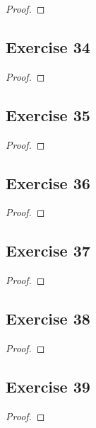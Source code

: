 \documentclass[14pt]{extarticle}
\begin{document}
\begin{proof}

\end{proof}

\subsection{Exercise 34}

\begin{proof}

\end{proof}

\subsection{Exercise 35}

\begin{proof}

\end{proof}

\subsection{Exercise 36}

\begin{proof}

\end{proof}

\subsection{Exercise 37}

\begin{proof}

\end{proof}

\subsection{Exercise 38}

\begin{proof}

\end{proof}

\subsection{Exercise 39}

\begin{proof}

\end{proof}
\end{document}
